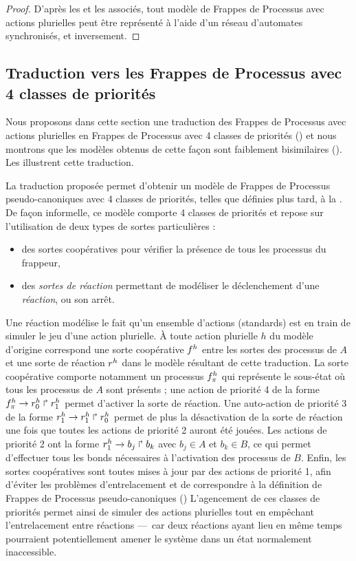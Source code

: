 \begin{proof}
  D'après les  et les 
  associés, tout modèle de Frappes de Processus avec actions plurielles peut être représenté
  à l'aide d'un réseau d'automates synchronisés, et inversement.
\end{proof}



\subsection{Traduction vers les Frappes de Processus avec 4 classes de priorités}

Nous proposons dans cette section une traduction des Frappes de Processus
avec actions plurielles en Frappes de Processus avec 4 classes de priorités ()
et nous montrons que les modèles obtenus de cette façon sont faiblement bisimilaires
().
Les  illustrent cette traduction.

La traduction proposée permet d'obtenir un modèle de
Frappes de Processus pseudo-canoniques avec 4 classes de priorités,
telles que définies plus tard, à la .
De façon informelle, ce modèle comporte 4 classes de priorités
et repose sur l'utilisation de deux types de sortes particulières :
\begin{itemize}
  \item des sortes coopératives pour vérifier la présence de tous les processus du frappeur,
  \item des \emph{sortes de réaction} permettant de modéliser le déclenchement d'une \emph{réaction},
    ou son arrêt.
\end{itemize}
Une réaction modélise le fait qu'un ensemble d'actions (standards) est en train
de simuler le jeu d'une action plurielle.
À toute action plurielle $h$ du modèle d'origine correspond une sorte coopérative $f^{h}$
entre les sortes des processus de $A$
et une sorte de réaction $r^{h}$ dans le modèle résultant de cette traduction.
La sorte coopérative comporte notamment un processus $f^{h}_\pi$ qui représente le sous-état
où tous les processus de $A$ sont présents ; une action de priorité 4 de la forme
$f^{h}_\pi\rightarrow r^{h}_0\Rsh r^{h}_1$ permet d'activer la sorte de réaction.
Une auto-action de priorité 3 de la forme $r^{h}_1\rightarrow r^{h}_1\Rsh r^{h}_0$
permet de plus la désactivation de la sorte de réaction
une fois que toutes les actions de priorité 2 auront été jouées.
Les actions de priorité 2 ont la forme $r^{h}_1\rightarrow b_j\Rsh b_k$
avec $b_j \in A$ et $b_k \in B$,
ce qui permet d'effectuer tous les bonds nécessaires à l'activation des processus de $B$.
Enfin, les sortes coopératives sont toutes mises à jour par des actions de priorité 1,
afin d'éviter les problèmes d'entrelacement
et de correspondre à la définition de Frappes de Processus pseudo-canoniques
()
L'agencement de ces classes de priorités permet ainsi de simuler des actions plurielles
tout en empêchant l'entrelacement entre réactions
---~car deux réactions ayant lieu en même temps pourraient potentiellement
amener le système dans un état normalement inaccessible.

